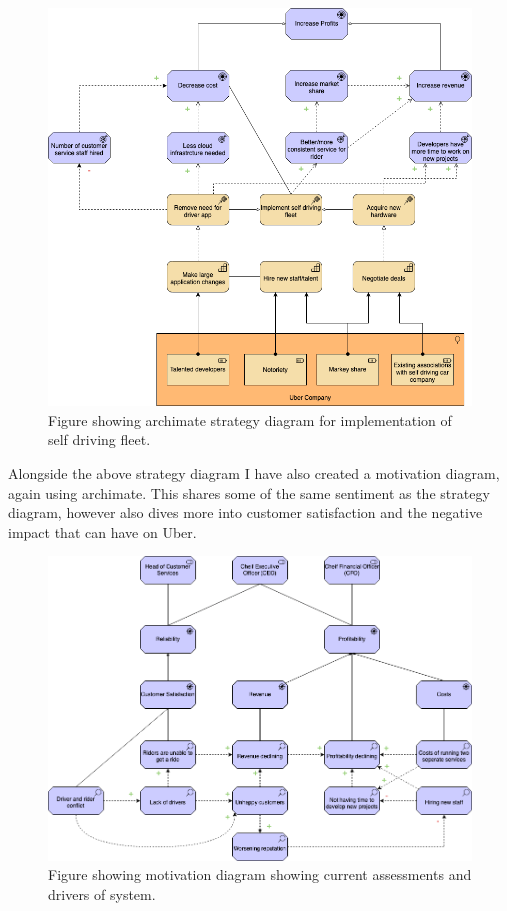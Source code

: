 \documentclass{article}
\begin{document}
    \begin{figure}[H]
      \centering
      \captionsetup{justification=centering}
      \includegraphics[width=12cm]{assets/strategy.drawio.png}
      \caption{Figure showing archimate strategy diagram for implementation of self driving fleet.}
      \label{fig:strategyDiagram}
    \end{figure}

    \newpage

    \noindent Alongside the above strategy diagram I have also created a motivation diagram, again using archimate. This shares some of the same sentiment 
    as the strategy diagram, however also dives more into customer satisfaction and the negative impact that can have on Uber.

    \begin{figure}[H]
      \centering
      \captionsetup{justification=centering}
      \includegraphics[width=12cm]{assets/motivation.drawio.png}
      \caption{Figure showing motivation diagram showing current assessments and drivers of system.}
      \label{fig:motivationsDiagram}
    \end{figure}
\end{document}
